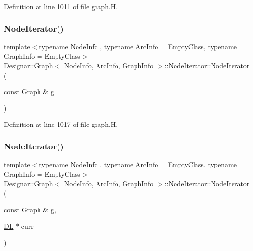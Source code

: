 Definition at line 1011 of file graph.\+H.

\mbox{\label{class_designar_1_1_graph_1_1_node_iterator_a646f28f9dbd99df7317dd0cf22122f42}} 
\subsubsection{\texorpdfstring{Node\+Iterator()}{NodeIterator()}\hspace{0.1cm}{\footnotesize\ttfamily [2/5]}}
{\footnotesize\ttfamily template$<$typename Node\+Info , typename Arc\+Info  = Empty\+Class, typename Graph\+Info  = Empty\+Class$>$ \\
\hyperlink{class_designar_1_1_graph}{Designar\+::\+Graph}$<$ Node\+Info, Arc\+Info, Graph\+Info $>$\+::Node\+Iterator\+::\+Node\+Iterator (\begin{DoxyParamCaption}\item[{const \hyperlink{class_designar_1_1_graph}{Graph} \&}]{g }\end{DoxyParamCaption})\hspace{0.3cm}{\ttfamily [inline]}}



Definition at line 1017 of file graph.\+H.

\mbox{\label{class_designar_1_1_graph_1_1_node_iterator_abc568563840c41429af62d925d45afc6}} 
\subsubsection{\texorpdfstring{Node\+Iterator()}{NodeIterator()}\hspace{0.1cm}{\footnotesize\ttfamily [3/5]}}
{\footnotesize\ttfamily template$<$typename Node\+Info , typename Arc\+Info  = Empty\+Class, typename Graph\+Info  = Empty\+Class$>$ \\
\hyperlink{class_designar_1_1_graph}{Designar\+::\+Graph}$<$ Node\+Info, Arc\+Info, Graph\+Info $>$\+::Node\+Iterator\+::\+Node\+Iterator (\begin{DoxyParamCaption}\item[{const \hyperlink{class_designar_1_1_graph}{Graph} \&}]{g,  }\item[{\hyperlink{class_designar_1_1_d_l}{DL} $\ast$}]{curr }\end{DoxyParamCaption})\hspace{0.3cm}{\ttfamily [inline]}}



